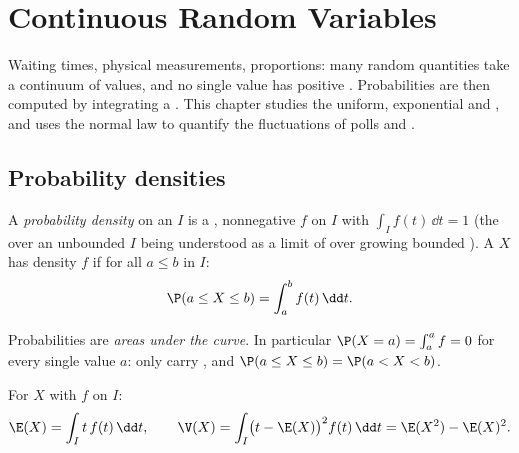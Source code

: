 \chapter{Continuous Random Variables}\label{ch:g12:contdist}

Waiting times, physical measurements, proportions: many random quantities
take a continuum of values, and no single value has positive .
Probabilities are then computed by integrating a \emph{}. This
chapter studies the uniform, exponential and , and uses
the normal law to quantify the fluctuations of polls and .

\section{Probability densities}

\begin{definition}\label{def:g12:contdist:density}
A \emph{probability density} on an  $I$ is a
, nonnegative  $f$ on $I$ with $\int_I f(t)\,\dd t = 1$
(the  over an unbounded $I$ being understood as a limit of
 over growing bounded ). A  $X$ has
density $f$ if for all $a \leq b$ in $I$:
\[
\P(a \leq X \leq b) = \int_a^b f(t)\,\dd t .
\]
\end{definition}

Probabilities are \emph{areas under the  curve}. In particular
$\P(X = a) = \int_a^a f = 0$ for every single value $a$: only 
carry , and $\P(a \leq X \leq b) = \P(a < X < b)$.

\begin{definition}\label{def:g12:contdist:exp}
For $X$ with  $f$ on $I$:
\[
\E(X) = \int_I t\,f(t)\,\dd t, \qquad
\V(X) = \int_I \bigl(t - \E(X)\bigr)^2 f(t)\,\dd t
= \E(X^2) - \E(X)^2 .
\]
\end{definition}


